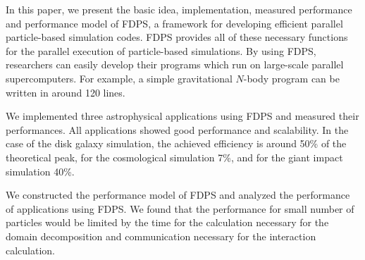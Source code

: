 
In this paper, we present the basic idea, implementation, measured
performance and performance model of FDPS, a framework for developing
efficient parallel particle-based simulation codes.  FDPS provides all
of these necessary functions for the parallel execution of
particle-based simulations. By using FDPS, researchers can easily
develop their programs which run on large-scale parallel
supercomputers. For example, a simple gravitational $N$-body program
can be written in around 120 lines.

We implemented three astrophysical applications using FDPS and
measured their performances. All applications showed good performance
and scalability. In the case of the disk galaxy simulation, the
achieved efficiency is around 50\% of the theoretical peak, for the
cosmological simulation 7\%, and for the giant impact simulation 40\%.

We constructed the performance model of FDPS and analyzed the
performance of applications using FDPS. We found that the performance
for small number of particles would be limited by the time for the
calculation necessary for the domain decomposition and communication
necessary for the interaction calculation. 







